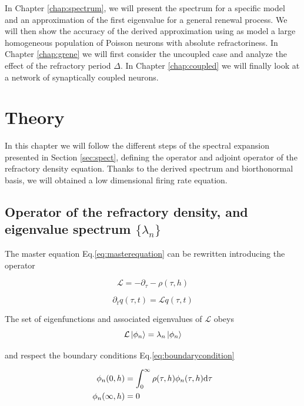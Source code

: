 \documentclass[12pt,twoside]{report}
\def \dd  {{\rm d}}
\begin{document}
In Chapter \ref{chap:spectrum}, we will present the spectrum for a specific model and an approximation of the first eigenvalue for a general renewal process. We will then show the accuracy of the derived approximation using as model a large homogeneous population of Poisson neurons with absolute refractoriness.
In Chapter \ref{chap:grene} we will first consider the uncoupled case and analyze the effect of the refractory period $\Delta$. In Chapter \ref{chap:coupled} we will finally look at a network of synaptically coupled neurons.



\chapter{Theory}
\label{chap:theory}

In this chapter we will follow the different steps of the spectral expansion presented in Section \ref{sec:spect}, defining the operator and adjoint operator of the refractory density equation. Thanks to the derived spectrum and biorthonormal basis, we will obtained a low dimensional firing rate equation.

\section{Operator of the refractory density, and eigenvalue spectrum $\{\lambda_n\}$}
\label{sec:op}

The master equation Eq.\eqref{eq:masterequation} can be rewritten introducing the operator 

\begin{equation}
\label{eq:Loperator}
\mathcal{L}=-\partial_\tau-\rho(\tau,h)
\end{equation}

\begin{equation}
\label{eq:masterequation2}
\partial_t q(\tau,t)=\mathcal{L}q(\tau,t)
\end{equation}

The set of eigenfunctions and associated eigenvalues of $\mathcal{L}$ obeys
\begin{equation}
\label{eq:Loperator2}
\mathcal{L}\ket{\phi_n}=\lambda_n\ket{\phi_n}
\end{equation}

and respect the boundary conditions Eq.\eqref{eq:boundarycondition}

\begin{align}
\label{eq:boundarycondition2}
\phi_n(0,h)&=\int_0^\infty\rho(\tau,h)\phi_n(\tau,h)\dd\tau\\
\phi_n(\infty,h)&=0
\end{align}
\end{document}
